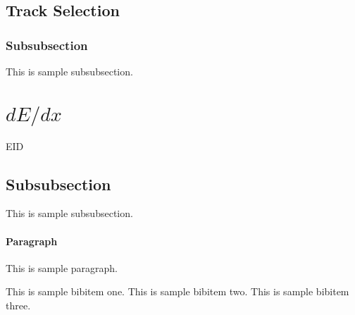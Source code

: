 \documentclass[18pt,a4paper]{article}
\begin{document}
\subsection{Track Selection}
 
\subsubsection{Subsubsection} 
 This is sample subsubsection.
 
 \section{$dE/dx$}
 EID
\subsection{Subsubsection} 
 This is sample subsubsection.

\paragraph{Paragraph} 
 This is sample paragraph.
\begin{thebibliography}{00}
 This is sample bibitem one. 
 This is sample bibitem two. 
 This is sample bibitem three.
\end{thebibliography} 
 
\end{document}

